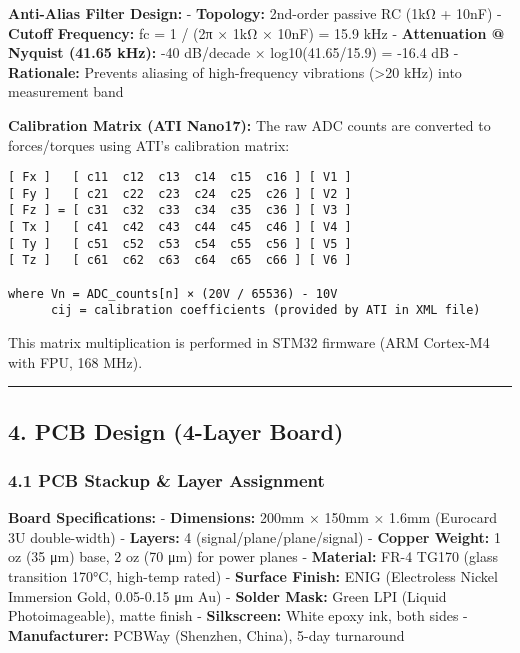 \documentclass[
]{article}
\begin{document}
\textbf{Anti-Alias Filter Design:} - \textbf{Topology:} 2nd-order
passive RC (1kΩ + 10nF) - \textbf{Cutoff Frequency:} fc = 1 / (2π × 1kΩ
× 10nF) = 15.9 kHz - \textbf{Attenuation @ Nyquist (41.65 kHz):} -40
dB/decade × log10(41.65/15.9) = -16.4 dB - \textbf{Rationale:} Prevents
aliasing of high-frequency vibrations (\textgreater20 kHz) into
measurement band

\textbf{Calibration Matrix (ATI Nano17):} The raw ADC counts are
converted to forces/torques using ATI's calibration matrix:

\begin{verbatim}
[ Fx ]   [ c11  c12  c13  c14  c15  c16 ] [ V1 ]
[ Fy ]   [ c21  c22  c23  c24  c25  c26 ] [ V2 ]
[ Fz ] = [ c31  c32  c33  c34  c35  c36 ] [ V3 ]
[ Tx ]   [ c41  c42  c43  c44  c45  c46 ] [ V4 ]
[ Ty ]   [ c51  c52  c53  c54  c55  c56 ] [ V5 ]
[ Tz ]   [ c61  c62  c63  c64  c65  c66 ] [ V6 ]

where Vn = ADC_counts[n] × (20V / 65536) - 10V
      cij = calibration coefficients (provided by ATI in XML file)
\end{verbatim}

This matrix multiplication is performed in STM32 firmware (ARM Cortex-M4
with FPU, 168 MHz).

\begin{center}\rule{0.5\linewidth}{0.5pt}\end{center}

\hypertarget{pcb-design-4-layer-board}{%
\subsection{4. PCB Design (4-Layer
Board)}\label{pcb-design-4-layer-board}}

\hypertarget{pcb-stackup-layer-assignment}{%
\subsubsection{4.1 PCB Stackup \& Layer
Assignment}\label{pcb-stackup-layer-assignment}}

\textbf{Board Specifications:} - \textbf{Dimensions:} 200mm × 150mm ×
1.6mm (Eurocard 3U double-width) - \textbf{Layers:} 4
(signal/plane/plane/signal) - \textbf{Copper Weight:} 1 oz (35 μm) base,
2 oz (70 μm) for power planes - \textbf{Material:} FR-4 TG170 (glass
transition 170°C, high-temp rated) - \textbf{Surface Finish:} ENIG
(Electroless Nickel Immersion Gold, 0.05-0.15 μm Au) - \textbf{Solder
Mask:} Green LPI (Liquid Photoimageable), matte finish -
\textbf{Silkscreen:} White epoxy ink, both sides -
\textbf{Manufacturer:} PCBWay (Shenzhen, China), 5-day turnaround
\end{document}
